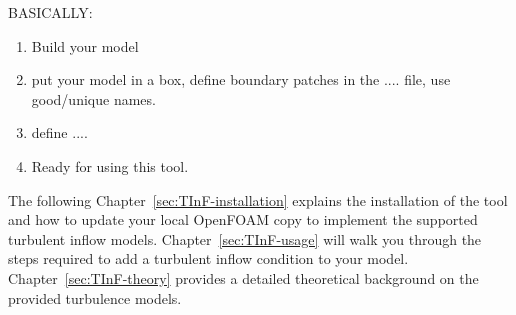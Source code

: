 

BASICALLY: 
\begin{enumerate}
\item
   Build your model
   
\item
   put your model in a box, define boundary patches in the .... file, use good/unique names.
   
\item
    define ....
    
\item 
    Ready for using this tool.
    
\end{enumerate}


\noindent
The following Chapter~\ref{sec:TInF-installation} explains the installation of the tool and how to update your local OpenFOAM copy to implement the supported turbulent inflow models.
Chapter~\ref{sec:TInF-usage} will walk you through the steps required to add a turbulent inflow condition to your model.
Chapter~\ref{sec:TInF-theory} provides a detailed theoretical background on the provided turbulence models.